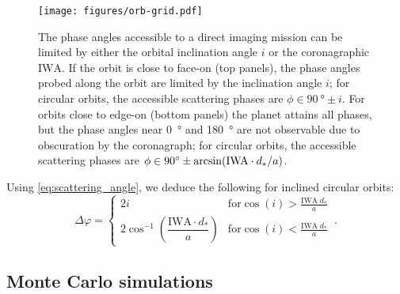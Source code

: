 \documentclass[
    usenatbib,
]{mnras}
\newcommand{\IWA}{\ensuremath{\mathrm{IWA}}}
\begin{document}
\begin{figure}
   \centering
   \texttt{[image: figures/orb-grid.pdf]}
   \caption{
        The phase angles accessible to a direct imaging mission 
        can be limited by either the orbital inclination angle $i$ or the coronagraphic \IWA{}.
        If the orbit is close to face-on (top panels), the phase angles probed along the orbit are limited by the inclination angle $i$; for circular orbits, the accessible scattering phases are $\phi \in \qty{90}{\degree} \pm i$. 
        For orbits close to edge-on (bottom panels) the planet attains all 
        phases, but the phase angles near \qty{0}{\degree} and \qty{180}{\degree} are not observable due to obscuration by the coronagraph; for circular orbits, the accessible scattering phases are $\phi \in \qty{90}{\degree} \pm \arcsin({\rm IWA}\cdot d_*/a)$.
    }
    \label{fig:orb-grid}
\end{figure}

Using \cref{eq:scattering_angle}, we deduce the following for inclined 
circular orbits: 
\begin{equation}
\label{eq:Delta_phi_max}
    \Delta \varphi = 
    \begin{cases}
        2 i & \textrm{for} \cos(i) > \frac{\mathrm{IWA}\; d_* }{a} \\ 
        2 \cos^{-1}\left(\dfrac{\mathrm{IWA}\cdot d_* }{a}\right) & \textrm{for} \cos(i) < \frac{\mathrm{IWA}\; d_* }{a}
    \end{cases} \,.
\end{equation}





\subsection{Monte Carlo simulations}
\label{subsec:2.3}
\end{document}
